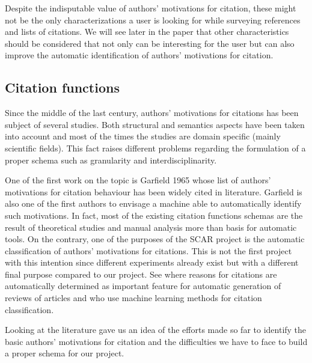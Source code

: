 \documentclass[runningheads,a4paper]{llncs}
\begin{document}
Despite the indisputable value of authors' motivations for citation, these might not be the only characterizations a user is looking for while surveying references and lists of citations. We will see later in the paper that other characteristics should be considered that not only can be interesting for the user but can also improve the automatic identification of authors' motivations for citation.

\subsection{Citation functions}\label{__RefHeading__183555_273733062}

Since the middle of the last century, authors' motivations for citations has been subject of several studies. Both structural and semantics aspects have been taken into account and most of the times the studies are domain specific (mainly scientific fields). This fact raises different problems regarding the formulation of a proper schema such as granularity and interdisciplinarity.

One of the first work on the topic is Garfield 1965  \cite{__RefNumPara__4477_348126194} whose list of authors' motivations for citation behaviour has been widely cited in literature. Garfield is also one of the first authors to envisage a machine able to automatically identify such motivations. In fact, most of the existing citation functions schemas are the result of theoretical studies and manual analysis more than basis for automatic tools. On the contrary, one of the purposes of the SCAR project is the automatic classification of authors' motivations for citations. This is not the first project with this intention since different experiments already exist but with a different final purpose compared to our project. See  \cite{__RefNumPara__4479_348126194} where reasons for citations are automatically determined as important feature for automatic generation of reviews of articles and  \cite{__RefNumPara__4481_348126194} who use machine learning methods for citation classification.

Looking at the literature gave us an idea of the efforts made so far to identify the basic authors' motivations for citation and the difficulties we have to face to build a proper schema for our project.
\end{document}
